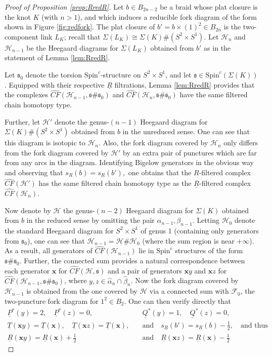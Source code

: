 \documentclass[11pt]{article}
\theoremstyle{plain} \newtheorem{thm}{Theorem}[subsection]
\theoremstyle{plain} \newtheorem{cor}[thm]{Corollary}
\theoremstyle{plain} \newtheorem{prop}[thm]{Proposition}
\theoremstyle{plain} \newtheorem{conj}[thm]{Conjecture}
\theoremstyle{plain} \newtheorem{lem}[thm]{Lemma}
\theoremstyle{definition} \newtheorem{df}[thm]{Definition}
\theoremstyle{remark} \newtheorem{rmk}[thm]{Remark}
\theoremstyle{remark} \newtheorem{obs}[thm]{Observation}
\newcommand{\B}[1]{B_{#1} }
\newcommand{\DBCs}[1]{\Sigma(#1)\#(S^{2}\times S^{1})}
\newcommand{\SxS}{S^{2}\times S^{1}}
\newcommand{\sfr}{\mathfrak{s}}
\newcommand{\sO}{\mathfrak{s}_{0}}
\newcommand{\DBC}[1]{\Sigma(#1)}
\newcommand{\h}{\mathcal{H}}
\newcommand{\red}[1]{\underline{#1}}
\newcommand{\ah}{\widehat{\alpha}}
\newcommand{\bh}{\widehat{\beta}}
\newcommand{\bx}{\mathbf{x}}
\numberwithin{equation}{section}
\begin{document}
\begin{proof}[Proof of Proposition \ref{prop:RredR}]
Let $b \in \B{2n-2}$ be a braid whose plat closure is the knot $K$ (with $n > 1$), and which induces a reducible fork diagram of the form shown in Figure \ref{fig:redfork}.  The plat closure of $b'= b\times (1)^{2} \in \B{2n}$ is the two-component link $L_K$; recall that $\DBC{L_K} \cong \DBCs{K}$.  Let $\h_{n}$ and $\h_{n-1}$ be the Heegaard diagrams for $\DBC{L_K}$ obtained from $b'$ as in the statement of Lemma \ref{lem:RredR}.

Let $\mathfrak{s}_{0}$ denote the torsion $\text{Spin}^{c}$-structure on $\SxS$, and let $\sfr \in \text{Spin}^{c}(\DBC{K})$.  Equipped with their respective $\red{R}$ filtrations, Lemma \ref{lem:RredR} provides that the complexes $\widehat{CF}(\h_{n-1}, \sfr \# \sO)$ and $\widehat{CF}(\h_{n}, \sfr \# \sO)$ have the same filtered chain homotopy type.

Further, let $\h'$ denote the genus-$(n-1)$ Heegaard diagram for $\DBCs{K}$ obtained from $b$ in the unreduced sense.  One can see that this diagram is isotopic to $\h_{n}$.  Also, the fork diagram covered by $\h_{n}$ only differs from the fork diagram covered by $\h'$ by an extra pair of punctures which are far from any arcs in the diagram.  Identifying Bigelow generators in the obvious way and observing that $s_{R}(b) = s_{\red{R}}(b'),$ one obtains that the $R$-filtered complex $\widehat{CF}(\h')$ has the same filtered chain homotopy type as the $\red{R}$-filtered complex $\widehat{CF}(\h_{n})$.

Now denote by $\h$ the genus-$(n-2)$ Heegaard diagram for $\DBC{K}$ obtained from $b$ in the reduced sense by omitting the pair $\alpha_{n-1},\beta_{n-1}$.  Letting $\h_{0}$ denote the standard Heegaard diagram for $\SxS$ of genus 1 (containing only generators from $\sO$), one can see that $\h_{n-1} = \h \# \h_{0}$ (where the sum region is near $+\infty$).   As a result, all generators of $\widehat{CF}(\h_{n-1})$ lie in $\text{Spin}^{c}$ structures of the form $\sfr \#\sO$.  Further, the connected sum provides a natural correspondence between each generator $\bx$ for $\widehat{CF}(\h,\sfr)$ and a pair of generators $\bx y$ and $\bx z$ for $\widehat{CF}(\h_{n-1},\sfr \#\sO)$, where $y,z \in \ah_{n} \cap \bh_{n}$.  Now the fork diagram covered by $\h_{n-1}$ is obtained from the one covered by $\h$ via a connected sum with $\mathcal{F}_0$, the two-puncture fork diagram for $1^2 \in \B{2}$. One can then verify directly that
\begin{align*}
\red{ P}^{*}(y) = 2, \quad \red{ P}^{*}(z) = 0, \quad &\red{Q}^{*}(y) = 1, \quad \red{Q}^{*}(z) = 0,\\
 \red{T}(\bx y) =  \red{T}(\bx),  \quad \red{T}(\bx z) =  \red{T}(\bx), \quad &\text{and} \quad s_{\red{R}}(b') = s_{\red{R}}(b) - \frac{1}{2}, \quad \text{and thus}\\
\red{R}(\bx y) =  \red{R}(\bx) + \frac{1}{2} \quad &\text{and} \quad \red{R}(\bx z) =  \red{R}(\bx) - \frac{1}{2} 
\end{align*}


\end{proof}
\end{document}
